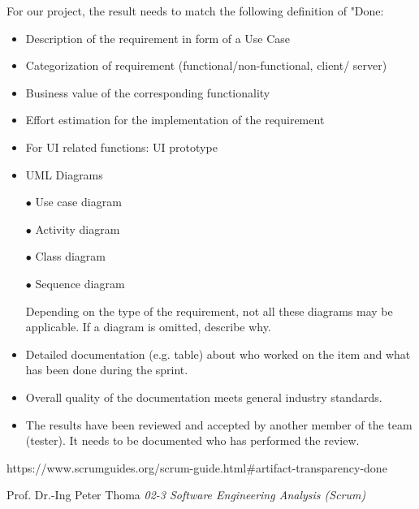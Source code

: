 \documentclass[a4paper, 12pt]{article}
\begin{document}
For our project, the result needs to match the following definition of "Done:
\begin{itemize}[label={\Square}]
\item Description of the requirement in form of a Use Case
\item Categorization of requirement (functional/non-functional, client/ server)
\item Business value of the corresponding functionality
\item Effort estimation for the implementation of the requirement
\item For UI related functions: UI prototype
\item UML Diagrams 

    $\bullet$ Use case diagram
    
    $\bullet$ Activity diagram
    
    $\bullet$ Class diagram
    
    $\bullet$ Sequence diagram
    
    Depending on the type of the requirement, not all these diagrams may be applicable. If a diagram is omitted, describe why.
\item Detailed documentation (e.g. table) about who worked on the item and what has been done during the sprint.
\item Overall quality of the documentation meets general industry standards.
\item The results have been reviewed and accepted by another member of the team (tester). It needs to be documented who has performed the review.
\end{itemize}



\newpage    

\begin{thebibliography}{}
https://www.scrumguides.org/scrum-guide.html\#artifact-transparency-done 

 Prof. Dr.-Ing Peter Thoma \emph{02-3 Software Engineering Analysis (Scrum)}

\end{thebibliography}

\end{document}
